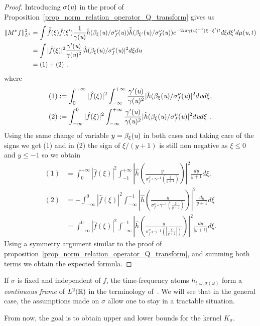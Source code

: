 \begin{proof}
	Introducing $\sigma(\textit{u})$ in the proof of Proposition~\ref{prop_norm_relation_operator_Q_transform} gives us 
	\begin{align*}
		\|M^\nu f\|^2_{L^2} & = \int \bar{\hat{f}}(\xi)\hat{f}(\xi')\frac{1}{\gamma(\textit{u})}\hat{h}(\beta_\xi(\textit{u})/\sigma_f^\nu(\textit{u}))\bar{\hat{h}}(\beta_{\xi'}(\textit{u})/\sigma_f^\nu(\textit{u}))e^{-2i\pi\gamma(\textit{u})^{-1}(\xi-\xi')t}d\xi d\xi'd\mu(\textit{u},t) \\
		& = \int |\hat{f}(\xi)|^2 \frac{\gamma'(\textit{u})}{\gamma(\textit{u})^2} |\hat{h}(\beta_\xi(\textit{u})/\sigma_f^\nu(\textit{u})|^2 d\xi d\textit{u} \\
		& = (1) + (2)\ ,
	\end{align*}
	where
	\begin{align*}
		(1) &:= \int_0^{+\infty}|\hat{f}(\xi)|^2\int_{-\infty}^{+\infty}\frac{\gamma'(\textit{u})}{\gamma(\textit{u})^2} |\hat{h}(\beta_\xi(\textit{u})/\sigma_f^\nu(\textit{u})|^2 d\textit{u} d\xi, \\
		(2) & := \int_{-\infty}^0|\hat{f}(\xi)|^2\int_{-\infty}^{+\infty}\frac{\gamma'(\textit{u})}{\gamma(\textit{u})^2} |\hat{h}(\beta_\xi(\textit{u})/\sigma_f^\nu(\textit{u})|^2 d\textit{u} d\xi\ .
	\end{align*}
	Using the same change of variable $y= \beta_\xi(\textit{u})$ in both cases and taking care of the signs we get (1) and in (2) the sign of $\xi/(y+1)$ is still non negative as $\xi\leqslant 0$ and $y\leqslant -1$ so we obtain
	\begin{align*}
		(1) &=  \int_0^{+\infty}|\hat{f}(\xi)|^2\int_{-1}^{+\infty} \left|\hat{h}\left( \frac{y}{\sigma_f^\nu\circ\gamma^{-1}(\frac{\xi}{y+1})} \right)\right|^2\frac{dy}{y+1} d\xi , \\
		(2) &= -\int_{-\infty}^0|\hat{f}(\xi)|^2 \int_{-\infty}^{-1} \left|\hat{h}\left( \frac{y}{\sigma_f^\nu\circ\gamma^{-1}(\frac{\xi}{y+1})} \right)\right|^2\frac{dy}{y+1} d\xi \\
		&= \int_{-\infty}^0|\hat{f}(\xi)|^2 \int_{-\infty}^{-1} \left|\hat{h}\left( \frac{y}{\sigma_f^\nu\circ\gamma^{-1}(|\frac{\xi}{y+1}|)} \right)\right|^2\frac{dy}{|y+1|} d\xi.
	\end{align*}
	Using a symmetry argument similar to the proof of proposition~\eqref{prop_norm_relation_operator_Q_transform}, and summing both terms we obtain the expected formula.
\end{proof}

	\begin{remark}
		If $\sigma$ is fixed and independent of $f$, the time-frequency atoms $h_{t,\omega,\sigma(\omega)}$ form a \textit{continuous frame} of $L^2(\mathbb{R})$ in the terminology of~\cite{Ali2000coherent,Dahlke2008generalized}. We will see that in the general case, the assumptions made on $\sigma$ allow one to stay in a tractable situation.
\end{remark} 
From now, the goal is to obtain upper and lower bounds for the kernel $K_\sigma$.

